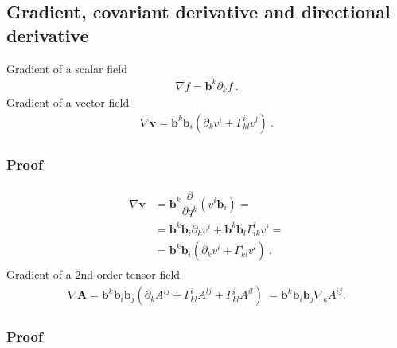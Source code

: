 \documentclass[letterpaper,10pt,english]{jupyterBook}
\begin{document}
\subsection{Gradient, covariant derivative and directional derivative}
\label{\detokenize{ch/relativity-general/differential-geometry:gradient-covariant-derivative-and-directional-derivative}}\label{\detokenize{ch/relativity-general/differential-geometry:relativity-general-notes-differential-geometry-gradient}}
\sphinxAtStartPar
Gradient of a scalar field
\begin{equation*}
\begin{split}\nabla f = \mathbf{b}^k \partial_k f \ .\end{split}
\end{equation*}
\sphinxAtStartPar
Gradient of a vector field
\begin{equation*}
\begin{split}\nabla \mathbf{v} = \mathbf{b}^k \mathbf{b}_i \left( \partial_k v^i + \Gamma_{kl}^{i} v^l  \right) \ .\end{split}
\end{equation*}\subsubsection*{Proof}
\begin{equation*}
\begin{split}\begin{aligned}
  \nabla \mathbf{v}
  & = \mathbf{b}^k \dfrac{\partial}{\partial q^k} \left( v^i \mathbf{b}_i \right) = \\
  & = \mathbf{b}^k \mathbf{b}_i \partial_k v^i + \mathbf{b}^k \mathbf{b}_l \Gamma_{ik}^{l} v^i = \\
  & = \mathbf{b}^k \mathbf{b}_i \left( \partial_k v^i + \Gamma_{kl}^{i} v^l \right) \ .
\end{aligned}\end{split}
\end{equation*}
\sphinxAtStartPar
Gradient of a 2\sphinxhyphen{}nd order tensor field
\begin{equation*}
\begin{split}\nabla \mathbf{A} = \mathbf{b}^k \mathbf{b}_i \mathbf{b}_j \left( \partial_k A^{ij} + \Gamma_{kl}^{i} A^{lj} + \Gamma_{kl}^{j} A^{il}  \right) \ = \mathbf{b}^k \mathbf{b}_i \mathbf{b}_j \nabla_k A^{ij}.\end{split}
\end{equation*}\subsubsection*{Proof}
\end{document}
